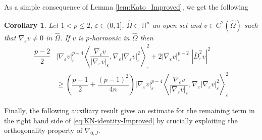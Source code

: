 \documentclass[10pt]{amsart}
\numberwithin{equation}{section}
\newtheorem{corollary}[theorem]{Corollary}
\theoremstyle{definition}
\newcommand{\He}{\mathbb{H}}
\begin{document}
As a simple consequence of Lemma \ref{lem:Kato_Improved}, we get the following
\begin{corollary}\label{cor:from_kato_improved}
	Let $1<p\leq 2$, $\varepsilon \in (0,1]$, $\widehat{\Omega} \subset \He^n$ an open set and $v\in C^2(\widehat{\Omega})$ such that $\nabla_\varepsilon v \neq 0$ in $\widehat{\Omega}$. If $v$ is $p$-harmonic in $\widehat{\Omega}$ then
	\begin{equation}
		\begin{aligned}
			\dfrac{p-2}{2}&|\nabla_{\varepsilon}v|_{\varepsilon}^{p-4} \left\langle \dfrac{\nabla_{\varepsilon}v}{|\nabla_{\varepsilon}v|_{\varepsilon}}, \nabla_{\varepsilon}|\nabla_{\varepsilon}v|_{\varepsilon}^2\right\rangle_{\varepsilon}^2 + 2|\nabla_{\varepsilon}v|^{p-2}_{\varepsilon}\, \, |\overline{D}^{2}_{\varepsilon}v|^2\\
			&\geq \left(\dfrac{p-1}{2} + \dfrac{(p-1)^2}{4n}\right)|\nabla_{\varepsilon}v|_{\varepsilon}^{p-4} \left\langle \dfrac{\nabla_{\varepsilon}v}{|\nabla_{\varepsilon}v|_{\varepsilon}}, \nabla_{\varepsilon}|\nabla_{\varepsilon}v|_{\varepsilon}^2\right\rangle_{\varepsilon}^2
		\end{aligned}
	\end{equation}		
\end{corollary}
Finally, the following auxiliary result gives an estimate for the remaining term in the right hand side of \eqref{eq:KN-identity-Improved} by crucially exploiting the orthogonality property of $\nabla_{0,J}$.
\end{document}
